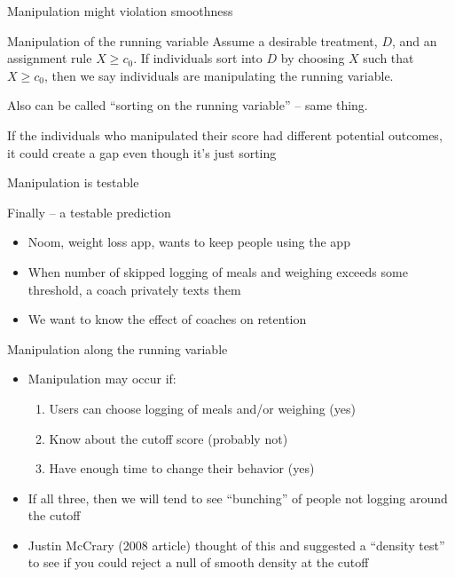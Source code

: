 \documentclass{beamer}
\begin{document}
\begin{frame}{Manipulation might violation smoothness}
	
	\begin{block}{Manipulation of the running variable}
Assume a desirable treatment, $D$, and an assignment rule $X\geq{c_0}$.  If individuals sort into $D$ by choosing $X$ such that $X\geq{c_0}$, then we say individuals are manipulating the running variable. 
	\end{block}
Also can be called ``sorting on the running variable'' -- same thing.

\bigskip

If the individuals who manipulated their score had different potential outcomes, it could create a gap even though it's just sorting

\end{frame}

\begin{frame}{Manipulation is testable}

Finally -- a testable prediction

\bigskip

	\begin{itemize}
		\item Noom, weight loss app, wants to keep people using the app
		\item When number of skipped logging of meals and weighing exceeds some threshold, a coach privately texts them
		\item We want to know the effect of coaches on retention
	\end{itemize}
			
\end{frame}

\begin{frame}{Manipulation along the running variable}

\begin{itemize}
	\item Manipulation may occur if:
		\begin{enumerate}
		\item Users can choose logging of meals and/or weighing (yes)
		\item Know about the cutoff score (probably not)
		\item Have enough time to change their behavior (yes)
		\end{enumerate}
	\item If all three, then we will tend to see ``bunching'' of people not logging around the cutoff
	\item Justin McCrary (2008 article) thought of this and suggested a ``density test'' to see if you could reject a null of smooth density at the cutoff 
\end{itemize}

\end{frame}
\end{document}
